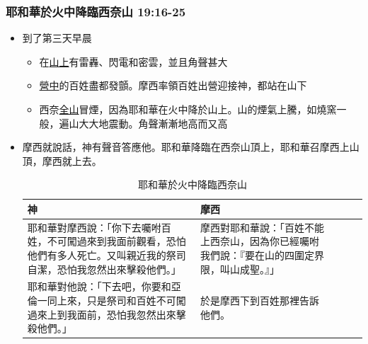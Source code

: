 \subsubsection{耶和華於火中降臨西奈山 19:16-25}
\begin{itemize} 
\itemsep-.35em
\item 到了第三天早晨
\begin{itemize} 
\itemsep-.35em
\item 在\underline{山上}有雷轟、閃電和密雲，並且角聲甚大
\item \underline{營中}的百姓盡都發顫。摩西率領百姓出營迎接神，都站在山下
\item 西奈\underline{全山}冒煙，因為耶和華在火中降於山上。山的煙氣上騰，如燒窯一般，遍山大大地震動。角聲漸漸地高而又高
\end{itemize}
\item 摩西就說話，神有聲音答應他。耶和華降臨在西奈山頂上，耶和華召摩西上山頂，摩西就上去。
\begin{table}[H]
\begin{threeparttable}
\begin{tabular}{@{}p{}*{4}{L{\tabcolsep\relax}}@{}}
\toprule
神 &  摩西 \\\hline
耶和華對摩西說：「你下去囑咐百姓，不可闖過來到我面前觀看，恐怕他們有多人死亡。又叫親近我的祭司自潔，恐怕我忽然出來擊殺他們。」&摩西對耶和華說：「百姓不能上西奈山，因為你已經囑咐我們說：『要在山的四圍定界限，叫山成聖。』」\tabularnewline\hline
耶和華對他說：「下去吧，你要和亞倫一同上來，只是祭司和百姓不可闖過來上到我面前，恐怕我忽然出來擊殺他們。」&於是摩西下到百姓那裡告訴他們。 \tabularnewline\hline
\hline
\bottomrule
\end{tabular}
\caption{耶和華於火中降臨西奈山}
\end{threeparttable}
\end{table} 
\end{itemize}


